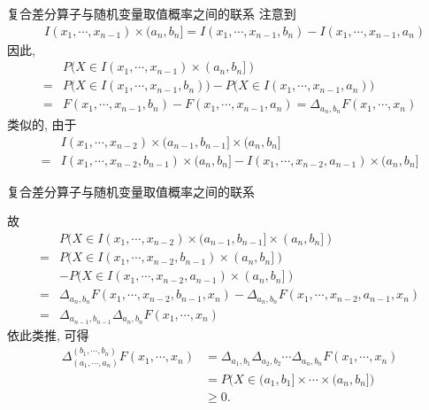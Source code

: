 \documentclass[Prob-All.tex]{subfiles}
\begin{document}
\begin{frame}{复合差分算子与随机变量取值概率之间的联系}
\zheng 注意到
\begin{align*}
  &I(x_1,\cdots,x_{n-1})\times (a_n,b_n] = I(x_1,\cdots,x_{n-1}, b_n) - I(x_1,\cdots,x_{n-1}, a_n)
\end{align*}
因此, \begin{align*}
  &P(X\in I(x_1,\cdots,x_{n-1})\times (a_n,b_n]) \\
  =&P\big( X\in I(x_1,\cdots,x_{n-1}, b_n)\big) - P\big(X\in I(x_1,\cdots,x_{n-1}, a_n)\big)\\
  =& F(x_1,\cdots,x_{n-1}, b_n) - F(x_1,\cdots,x_{n-1}, a_n)=\Delta_{a_{n},b_n} F(x_1,\cdots,x_n)
\end{align*}
类似的, 由于
\begin{align*}
  &I(x_1,\cdots,x_{n-2})\times (a_{n-1}, b_{n-1}]\times (a_n,b_n] \\
  =& I(x_1,\cdots,x_{n-2}, b_{n-1})\times (a_n, b_n] - I(x_1,\cdots,x_{n-2}, a_{n-1})\times (a_n, b_n]
\end{align*}

\end{frame}

\begin{frame}{复合差分算子与随机变量取值概率之间的联系}

故
\begin{align*}
  &P(X\in I(x_1,\cdots, x_{n-2})\times (a_{n-1}, b_{n-1}]\times (a_n,b_n])\\
  =&P(X\in I(x_1,\cdots,x_{n-2},b_{n-1})\times (a_n,b_n])\\
  &-P(X\in I(x_1,\cdots,x_{n-2},a_{n-1})\times (a_n,b_n])\\
  =&\Delta_{a_n,b_n}F(x_1,\cdots,x_{n-2},b_{n-1}, x_n)-\Delta_{a_n,b_n}F(x_1,\cdots,x_{n-2},a_{n-1}, x_n)\\
  =&\Delta_{a_{n-1},b_{n-1}}\Delta_{a_n,b_n}F(x_1,\cdots,x_n)
\end{align*}
\pause
依此类推, 可得
\begin{align*}
  \Delta_{\left(a_{1}, \cdots, a_{n}\right)}^{\left(b_{1}, \cdots, b_{n}\right)} F(x_1,\cdots,x_n) &=\Delta_{a_{1}, b_{1}} \Delta_{a_{2}, b_{2}} \cdots \Delta_{a_{n}, b_{n}} F\left(x_{1}, \cdots, x_{n}\right) \\
  &=P\big( X\in (a_1,b_1]\times\cdots\times (a_n,b_n]\big)\\
  &\geq 0.
\end{align*}
\end{frame}
\end{document}
